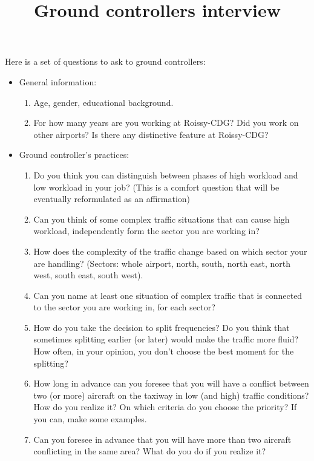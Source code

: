 \documentclass{article}
\begin{document}
	
	\title{Ground controllers interview}
	\maketitle
	Here is a set of questions to ask to ground controllers:
	
	\begin{itemize}
		\item General information:
		\begin{enumerate}
			\item Age, gender, educational background.
			
			\item For how many years are you working at Roissy-CDG? Did you work on other airports? Is there any distinctive feature at Roissy-CDG? 
		\end{enumerate}
		\item Ground controller's practices:    
		\begin{enumerate}
			\item Do you think you can distinguish between phases of high workload and low workload in your job? (This is a comfort question that will be eventually reformulated as an affirmation)
			\item Can you think of some complex traffic situations that can cause high workload, independently form the sector you are working in?        	
			\item How does the complexity of the traffic change based on which sector your are handling? (Sectors: whole airport, north, south, north east, north west, south east, south west).       	
			\item Can you name at least one situation of complex traffic that is connected to the sector you are working in, for each sector?
			
			\item How do you take the decision to split frequencies? Do you think that sometimes splitting earlier (or later) would make the traffic more fluid? How often, in your opinion, you don't choose the best moment for the splitting?
			
			\item How long in advance can you foresee that you will have a conflict between two (or more) aircraft on the taxiway in low (and high) traffic conditions? How do you realize it? On which criteria do you choose the priority? If you can, make some examples.
			
			\item Can you foresee in advance that you will have more than two aircraft conflicting in the same area? What do you do if you realize it? 
			

\end{enumerate}
\end{itemize}
\end{document}
